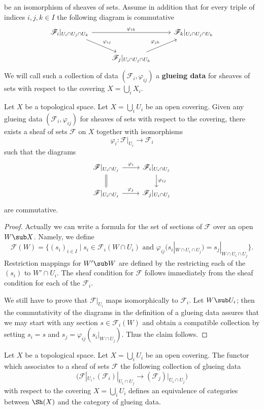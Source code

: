 be an isomorphism of sheaves of sets. Assume in addition that for every triple of indices $i,j,k\in I$ the following diagram is commutative
\[\begin{tikzcd}
\mathscr{F}_i|_{U_i\cap U_j\cap U_k}\ar[rr,"\varphi_{ik}"]\ar[rd,"\varphi_{ij}"]&&\mathscr{F}_k|_{U_i\cap U_j\cap U_k}\\
&\mathscr{F}_j|_{U_i\cap U_j\cap U_k}\ar[ru,"\varphi_{jk}"]
\end{tikzcd}\]
We will call such a collection of data $(\mathscr{F}_i,\varphi_{ij})$ a \textbf{glueing data} for sheaves of sets with respect to the covering $X=\bigcup_iX_i$.
\begin{proposition}\label{sheaf glue construction}
Let $X$ be a topological space. Let $X=\bigcup_iU_i$ be an open covering. Given any glueing data $(\mathscr{F}_i,\varphi_{ij})$ for sheaves of sets with respect to the covering, there exists a sheaf of sets $\mathscr{F}$ on $X$ together with isomorphisms
\[\varphi_i:\mathscr{F}|_{U_i}\to\mathscr{F}_i\]
such that the diagrams
\[\begin{tikzcd}
\mathscr{F}|_{U_i\cap U_j}\ar[r,"\varphi_i"]\ar[d,equal]&\mathscr{F}_i|_{U_i\cap U_j}\ar[d,"\varphi_{ij}"]\\
\mathscr{F}|_{U_i\cap U_j}\ar[r,"\varphi_j"]&\mathscr{F}_j|_{U_i\cap U_j}
\end{tikzcd}\]
are commutative.
\end{proposition}
\begin{proof}
Actually we can write a formula for the set of sections of $\mathscr{F}$ over an open $W\sub X$. Namely, we define
\[\mathscr{F}(W)=\{(s_i)_{i\in I}\mid\text{$s_i\in\mathscr{F}_i(W\cap U_i)$ and $\varphi_{ij}(s_i|_{W\cap U_i\cap U_j})=s_j|_{W\cap U_i\cap U_j}$}\}.\]
Restriction mappings for $W'\sub W$ are defined by the restricting each of the $(s_i)$ to $W'\cap U_i$. The sheaf condition for $\mathscr{F}$ follows immediately from the sheaf condition for each of the $\mathscr{F}_i$.\par
We still have to prove that $\mathscr{F}|_{U_i}$ maps isomorphically to $\mathscr{F}_i$. Let $W\sub U_i$; then the commutativity of the diagrams in the definition of a glueing data assures that we may start with any section $s\in\mathscr{F}_i(W)$ and obtain a compatible collection by setting $s_i=s$ and $s_j=\varphi_{ij}(s_{i}|_{W\cap U_j})$. Thus the claim follows.
\end{proof}
\begin{corollary}\label{sheaf cat equivalent to glueing data}
Let $X$ be a topological space. Let $X=\bigcup_iU_i$ be an open covering. The functor which associates to a sheaf of sets $\mathscr{F}$ the following collection of glueing data
\[\big(\mathscr{F}|_{U_i},(\mathscr{F}_i)|_{U_i\cap U_j}\to(\mathscr{F}_j)|_{U_i\cap U_j}\big)\]
with respect to the covering $X=\bigcup_iU_i$ defines an equivalence of categories between $\Sh(X)$ and the category of glueing data.
\end{corollary}
